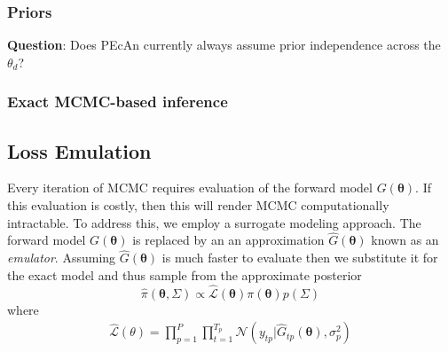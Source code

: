 \documentclass[12pt]{article}
\newcommand{\btheta}{\boldsymbol{\theta}}
\begin{document}
\subsubsection{Priors}

\bigskip
\noindent
\textbf{Question}: Does PEcAn currently always assume prior independence across the $\theta_d$? 

\subsubsection{Exact MCMC-based inference}

\subsection{Loss Emulation}
Every iteration of MCMC requires evaluation of the forward model $G(\btheta)$. If this evaluation is costly, then this will render MCMC computationally intractable. To address this, we employ a surrogate modeling approach. 
The forward model $G(\btheta)$ is replaced by an an approximation $\hat{G}(\btheta)$ known as an \textit{emulator}. Assuming $\hat{G}(\btheta)$ is much faster to evaluate then we substitute it for the exact model and thus 
sample from the approximate posterior
 \[\hat{\pi}(\btheta, \Sigma) \propto \hat{\mathcal{L}}(\btheta)\pi(\btheta)p(\Sigma)\]
 where 
 \begin{align*}
\hat{\mathcal{L}}(\theta) = \prod_{p = 1}^{P} \prod_{t = 1}^{T_p} \mathcal{N}\left(y_{tp}| \hat{G}_{tp}(\btheta), \sigma_p^2 \right)
\end{align*}
 
\end{document}
